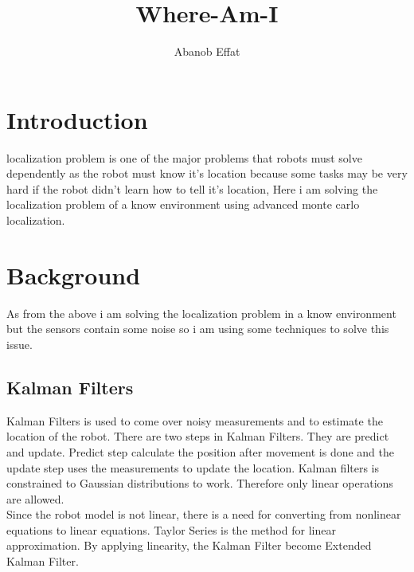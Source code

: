 \documentclass[10pt,journal,compsoc]{IEEEtran}
\begin{document}
\title{Where-Am-I}

\author{Abanob Effat}

%
{}


\maketitle
\IEEEdisplaynontitleabstractindextext
\IEEEpeerreviewmaketitle
\section{Introduction}
\label{sec:introduction}

 localization problem is one of the major problems that robots must solve dependently as the robot must know it's location because some tasks may be very hard if the robot didn't learn how to tell it's location, Here i am solving the localization problem of a know environment using advanced monte carlo localization.





\section{Background}
As from the above i am solving the localization problem in a know environment but the sensors contain some noise so i am using some techniques to solve this issue.

\subsection{Kalman Filters}
Kalman Filters is used to come over noisy measurements and to estimate the location of the robot. There are two steps in Kalman Filters. They are predict and update. Predict step calculate the position after movement is done and the update step uses the measurements to update the location.
Kalman filters is constrained to Gaussian distributions to work. Therefore only linear operations are allowed. \\
Since the robot model is not linear, there is a need for converting from nonlinear equations to linear equations. Taylor Series is the method for linear approximation. By applying linearity, the Kalman Filter become Extended Kalman Filter. 
\end{document}
